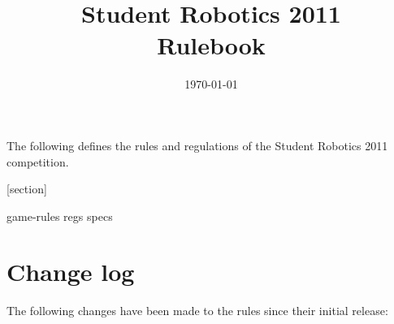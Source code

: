 \documentclass[a4paper, 12pt]{article}
\title {Student Robotics 2011\\ Rulebook}
\date{\today}
\begin{document}
\maketitle

\noindent The following defines the rules and regulations of the Student Robotics 2011 competition.

[section]
\newcommand{\rcn}{\stepcounter{rule}\arabic{section}.\arabic{rule}}
\renewcommand{\labelenumi}{\rcn}

 {game-rules}
\newpage
 {regs}
\newpage
 {specs}

\section{Change log}
The following changes have been made to the rules since their initial release:
\end{document}
